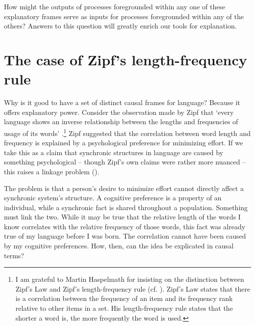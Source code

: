 How might the outputs of processes foregrounded within any one of these 
explanatory frames serve as inputs for processes foregrounded within any 
of the others? Answers to this question will greatly enrich our tools for 
explanation.



\section{The case of Zipf's length-frequency rule}
\label{zipflengthrule}
Why is it good to have a set of distinct causal frames for language?
Because it offers explanatory power. Consider the observation made by Zipf that \textquoteleft every language shows an inverse relationship between the lengths 
and frequencies of usage of its words' \citep[66]{zipf_human_1949}.\footnote{I am grateful to Martin Haspelmath for insisting on the distinction between Zipf's Law and Zipf's length-frequency rule (cf. \citealt{NewmanPowerLaws2006}). Zipf's Law states that there is a correlation between the frequency of an item and its frequency rank relative to other items in a set. His length-frequency rule states that the shorter a word is, the more frequently the word is used.} Zipf suggested that the correlation between word length and frequency is explained by a psychological preference for minimizing 
effort. If we take this as a claim that synchronic structures in 
language are caused by something psychological -- though Zipf's own claims 
were rather more nuanced -- this raises a linkage problem (\citealt[201]{clark_psychological_1984}). 



The problem is that a person's desire to minimize effort cannot directly affect a synchronic system's structure. 
A cognitive preference is a property of an individual, while a synchronic 
fact is shared throughout a population. Something must link the two. 
While it may be true that the relative length of the words I know 
correlates with the relative frequency of those words, this fact was 
already true of my language before I was born. The correlation cannot have been caused by my cognitive 
preferences. How, then, can the idea be explicated in causal terms?



